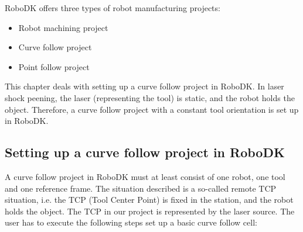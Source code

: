 RoboDK offers three types of robot manufacturing projects:

\begin{itemize}

    \item Robot machining project
    \item Curve follow project 
    \item Point follow project 

\end{itemize}

This chapter deals with setting up a curve follow project in RoboDK. In laser shock peening, the laser (representing the tool) is static, and the robot holds the object. Therefore, a curve follow project with a constant tool orientation is set up in RoboDK.

\subsection{Setting up a curve follow project in RoboDK}

A curve follow project in RoboDK must at least consist of one robot, one tool and one reference frame. The situation described is a so-called remote TCP situation, i.e. the TCP (Tool Center Point) is fixed in the station, and the robot holds the object. The TCP in our project is represented by the laser source. 
The user has to execute the following steps set up a basic curve follow cell: 

